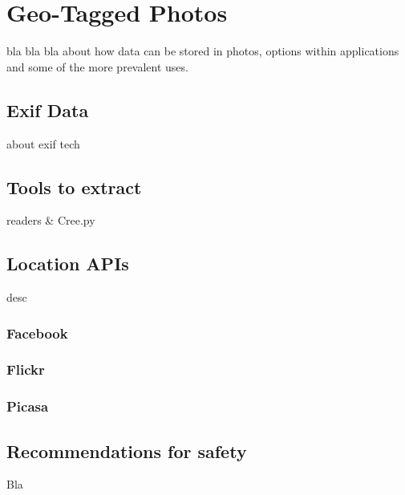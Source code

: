 \section{Geo-Tagged Photos}
bla bla bla about how data can be stored in photos, options within applications
and some of the more prevalent uses.

\subsection{Exif Data}
about exif tech

\subsection{Tools to extract}
readers \& Cree.py

\subsection{Location APIs}
desc

\subsubsection{Facebook}
\subsubsection{Flickr}
\subsubsection{Picasa}

\subsection{Recommendations for safety}
Bla

